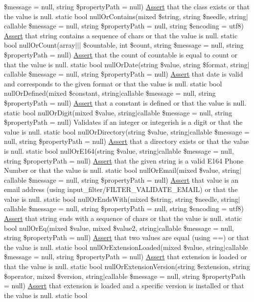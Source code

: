 \$message = null, string \$property\+Path = null) \mbox{\hyperlink{class_assert_1_1_assert}{Assert}} that the class exists or that the value is null.  static bool null\+Or\+Contains(mixed \$string, string \$needle, string$\vert$callable \$message = null, string \$property\+Path = null, string \$encoding = \textquotesingle{}utf8\textquotesingle{}) \mbox{\hyperlink{class_assert_1_1_assert}{Assert}} that string contains a sequence of chars or that the value is null.  static bool null\+Or\+Count(array$\vert$$\vert$$\vert$ \$countable, int \$count, string \$message = null, string \$property\+Path = null) \mbox{\hyperlink{class_assert_1_1_assert}{Assert}} that the count of countable is equal to count or that the value is null.  static bool null\+Or\+Date(string \$value, string \$format, string$\vert$callable \$message = null, string \$property\+Path = null) \mbox{\hyperlink{class_assert_1_1_assert}{Assert}} that date is valid and corresponds to the given format or that the value is null.  static bool null\+Or\+Defined(mixed \$constant, string$\vert$callable \$message = null, string \$property\+Path = null) \mbox{\hyperlink{class_assert_1_1_assert}{Assert}} that a constant is defined or that the value is null.  static bool null\+Or\+Digit(mixed \$value, string$\vert$callable \$message = null, string \$property\+Path = null) Validates if an integer or integerish is a digit or that the value is null.  static bool null\+Or\+Directory(string \$value, string$\vert$callable \$message = null, string \$property\+Path = null) \mbox{\hyperlink{class_assert_1_1_assert}{Assert}} that a directory exists or that the value is null.  static bool null\+Or\+E164(string \$value, string$\vert$callable \$message = null, string \$property\+Path = null) \mbox{\hyperlink{class_assert_1_1_assert}{Assert}} that the given string is a valid E164 Phone Number or that the value is null.  static bool null\+Or\+Email(mixed \$value, string$\vert$callable \$message = null, string \$property\+Path = null) \mbox{\hyperlink{class_assert_1_1_assert}{Assert}} that value is an email address (using input\+\_\+filter/\+F\+I\+L\+T\+E\+R\+\_\+\+V\+A\+L\+I\+D\+A\+T\+E\+\_\+\+E\+M\+A\+IL) or that the value is null.  static bool null\+Or\+Ends\+With(mixed \$string, string \$needle, string$\vert$callable \$message = null, string \$property\+Path = null, string \$encoding = \textquotesingle{}utf8\textquotesingle{}) \mbox{\hyperlink{class_assert_1_1_assert}{Assert}} that string ends with a sequence of chars or that the value is null.  static bool null\+Or\+Eq(mixed \$value, mixed \$value2, string$\vert$callable \$message = null, string \$property\+Path = null) \mbox{\hyperlink{class_assert_1_1_assert}{Assert}} that two values are equal (using ==) or that the value is null.  static bool null\+Or\+Extension\+Loaded(mixed \$value, string$\vert$callable \$message = null, string \$property\+Path = null) \mbox{\hyperlink{class_assert_1_1_assert}{Assert}} that extension is loaded or that the value is null.  static bool null\+Or\+Extension\+Version(string \$extension, string \$operator, mixed \$version, string$\vert$callable \$message = null, string \$property\+Path = null) \mbox{\hyperlink{class_assert_1_1_assert}{Assert}} that extension is loaded and a specific version is installed or that the value is null.  static bool 